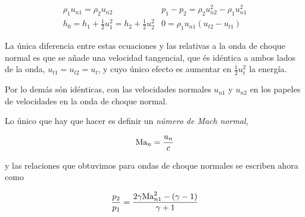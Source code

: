 	\[
	\begin{array}{cc}
		\rho_{1}u_{n1}=\rho_{2}u_{n2} & p_{1}-p_{2}=\rho_{2}u_{n2}^{2}-\rho_{1}u_{n1}^{2}\\
		h_{0}=h_{1}+\frac{1}{2}u_{1}^{2}=h_{2}+\frac{1}{2}u_{2}^{2} & 0=\rho_{1}u_{n1}(u_{t2}-u_{t1})
	\end{array}
	\]
	
	
	\begin{center}
		\par\end{center}
	
	
	La única diferencia entre estas ecuaciones y las relativas a la onda
	de choque normal es que se añade una velocidad tangencial, que és
	idéntica a ambos lados de la onda, $u_{t1}=u_{t2}=u_{t}$, y cuyo
	único efecto es aumentar en $\frac{1}{2}u_{t}^{2}$ la energía.
	
	Por lo demás són idénticas, con las velocidades normales $u_{n1}$
	y $u_{n2}$ en los papeles de velocidades en la onda de choque normal. 
	
	Lo único que hay que hacer es definir un \emph{número de Mach normal},
	
\begin{equation}
		\text{Ma}_{n}=\frac{u_{n}}{c}
\end{equation}
	
	
	y las relaciones que obtuvimos para ondas de choque normales se escriben
	ahora como
	
\begin{equation}		\frac{p_{2}}{p_{1}}=\frac{2\gamma\text{Ma}_{n1}^{2}-(\gamma-1)}{\gamma+1}
\end{equation}
	

